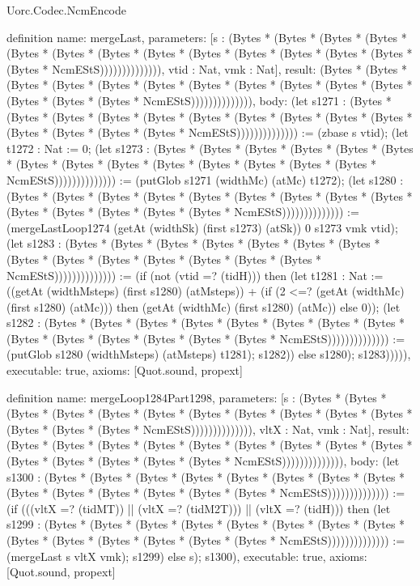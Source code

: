 \begin{lexlean}{Uorc.Codec.NcmEncode}
\begin{semanticmodule}
definition{
  name: mergeLast,
  parameters: [s : (Bytes * (Bytes * (Bytes * (Bytes * (Bytes * (Bytes * (Bytes * (Bytes * (Bytes * (Bytes * (Bytes * (Bytes * (Bytes * (Bytes * NcmEStS)))))))))))))), vtid : Nat, vmk : Nat],
  result: (Bytes * (Bytes * (Bytes * (Bytes * (Bytes * (Bytes * (Bytes * (Bytes * (Bytes * (Bytes * (Bytes * (Bytes * (Bytes * (Bytes * NcmEStS)))))))))))))),
  body: (let s1271 : (Bytes * (Bytes * (Bytes * (Bytes * (Bytes * (Bytes * (Bytes * (Bytes * (Bytes * (Bytes * (Bytes * (Bytes * (Bytes * (Bytes * NcmEStS)))))))))))))) := (zbase s vtid); (let t1272 : Nat := 0; (let s1273 : (Bytes * (Bytes * (Bytes * (Bytes * (Bytes * (Bytes * (Bytes * (Bytes * (Bytes * (Bytes * (Bytes * (Bytes * (Bytes * (Bytes * NcmEStS)))))))))))))) := (putGlob s1271 (widthMc) (atMc) t1272); (let s1280 : (Bytes * (Bytes * (Bytes * (Bytes * (Bytes * (Bytes * (Bytes * (Bytes * (Bytes * (Bytes * (Bytes * (Bytes * (Bytes * (Bytes * NcmEStS)))))))))))))) := (mergeLastLoop1274 (getAt (widthSk) (first s1273) (atSk)) 0 s1273 vmk vtid); (let s1283 : (Bytes * (Bytes * (Bytes * (Bytes * (Bytes * (Bytes * (Bytes * (Bytes * (Bytes * (Bytes * (Bytes * (Bytes * (Bytes * (Bytes * NcmEStS)))))))))))))) := (if (not (vtid =? (tidH))) then (let t1281 : Nat := ((getAt (widthMsteps) (first s1280) (atMsteps)) + (if (2 <=? (getAt (widthMc) (first s1280) (atMc))) then (getAt (widthMc) (first s1280) (atMc)) else 0)); (let s1282 : (Bytes * (Bytes * (Bytes * (Bytes * (Bytes * (Bytes * (Bytes * (Bytes * (Bytes * (Bytes * (Bytes * (Bytes * (Bytes * (Bytes * NcmEStS)))))))))))))) := (putGlob s1280 (widthMsteps) (atMsteps) t1281); s1282)) else s1280); s1283))))),
  executable: true,
  axioms: [Quot.sound, propext]
}

definition{
  name: mergeLoop1284Part1298,
  parameters: [s : (Bytes * (Bytes * (Bytes * (Bytes * (Bytes * (Bytes * (Bytes * (Bytes * (Bytes * (Bytes * (Bytes * (Bytes * (Bytes * (Bytes * NcmEStS)))))))))))))), vltX : Nat, vmk : Nat],
  result: (Bytes * (Bytes * (Bytes * (Bytes * (Bytes * (Bytes * (Bytes * (Bytes * (Bytes * (Bytes * (Bytes * (Bytes * (Bytes * (Bytes * NcmEStS)))))))))))))),
  body: (let s1300 : (Bytes * (Bytes * (Bytes * (Bytes * (Bytes * (Bytes * (Bytes * (Bytes * (Bytes * (Bytes * (Bytes * (Bytes * (Bytes * (Bytes * NcmEStS)))))))))))))) := (if (((vltX =? (tidMT)) || (vltX =? (tidM2T))) || (vltX =? (tidH))) then (let s1299 : (Bytes * (Bytes * (Bytes * (Bytes * (Bytes * (Bytes * (Bytes * (Bytes * (Bytes * (Bytes * (Bytes * (Bytes * (Bytes * (Bytes * NcmEStS)))))))))))))) := (mergeLast s vltX vmk); s1299) else s); s1300),
  executable: true,
  axioms: [Quot.sound, propext]
}


\end{semanticmodule}
\end{lexlean}
